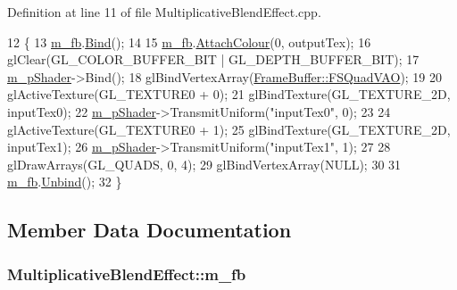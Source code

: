 Definition at line 11 of file Multiplicative\+Blend\+Effect.\+cpp.


\begin{DoxyCode}
12 \{
13   \hyperlink{class_multiplicative_blend_effect_ae0c0802014bfe79092d61ebfcbb3204c}{m\_fb}.\hyperlink{class_frame_buffer_ae7e61568475fba3b15e446c9061833ea}{Bind}();
14 
15   \hyperlink{class_multiplicative_blend_effect_ae0c0802014bfe79092d61ebfcbb3204c}{m\_fb}.\hyperlink{class_frame_buffer_a1556417c0dec00d1d24bdf0e84bc4c4d}{AttachColour}(0, outputTex);
16   glClear(GL\_COLOR\_BUFFER\_BIT | GL\_DEPTH\_BUFFER\_BIT);
17   \hyperlink{class_multiplicative_blend_effect_a32258366995f3ff069b7ee81506c0118}{m\_pShader}->Bind();
18   glBindVertexArray(\hyperlink{class_frame_buffer_a22b0c9de2bef06e0de865684556a6677}{FrameBuffer::FSQuadVAO});
19 
20   glActiveTexture(GL\_TEXTURE0 + 0);
21   glBindTexture(GL\_TEXTURE\_2D, inputTex0);
22   \hyperlink{class_multiplicative_blend_effect_a32258366995f3ff069b7ee81506c0118}{m\_pShader}->TransmitUniform(\textcolor{stringliteral}{"inputTex0"}, 0);
23 
24   glActiveTexture(GL\_TEXTURE0 + 1);
25   glBindTexture(GL\_TEXTURE\_2D, inputTex1);
26   \hyperlink{class_multiplicative_blend_effect_a32258366995f3ff069b7ee81506c0118}{m\_pShader}->TransmitUniform(\textcolor{stringliteral}{"inputTex1"}, 1);
27 
28   glDrawArrays(GL\_QUADS, 0, 4);
29   glBindVertexArray(NULL);
30 
31   \hyperlink{class_multiplicative_blend_effect_ae0c0802014bfe79092d61ebfcbb3204c}{m\_fb}.\hyperlink{class_frame_buffer_a1e114b325998ec4e4b9a9ea090d64ae8}{Unbind}();
32 \}
\end{DoxyCode}


\subsection{Member Data Documentation}
\subsubsection[{\texorpdfstring{m\+\_\+fb}{m_fb}}]{ Multiplicative\+Blend\+Effect\+::m\+\_\+fb\hspace{0.3cm}{\ttfamily [private]}}\hypertarget{class_multiplicative_blend_effect_ae0c0802014bfe79092d61ebfcbb3204c}{}\label{class_multiplicative_blend_effect_ae0c0802014bfe79092d61ebfcbb3204c}



